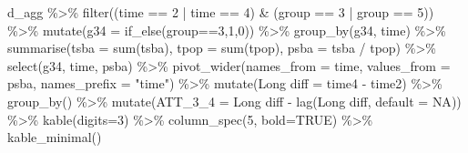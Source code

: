 \documentclass[
]{article}
\newenvironment{Shaded}{\begin{snugshade}}{\end{snugshade}}
\newcommand{\AttributeTok}[1]{\textcolor[rgb]{0.77,0.63,0.00}{#1}}
\newcommand{\ConstantTok}[1]{\textcolor[rgb]{0.00,0.00,0.00}{#1}}
\newcommand{\DecValTok}[1]{\textcolor[rgb]{0.00,0.00,0.81}{#1}}
\newcommand{\FunctionTok}[1]{\textcolor[rgb]{0.00,0.00,0.00}{#1}}
\newcommand{\NormalTok}[1]{#1}
\newcommand{\OtherTok}[1]{\textcolor[rgb]{0.56,0.35,0.01}{#1}}
\newcommand{\SpecialCharTok}[1]{\textcolor[rgb]{0.00,0.00,0.00}{#1}}
\newcommand{\StringTok}[1]{\textcolor[rgb]{0.31,0.60,0.02}{#1}}
\begin{document}
\begin{Shaded}
\begin{Highlighting}[]
\NormalTok{d\_agg }\SpecialCharTok{\%\textgreater{}\%} \FunctionTok{filter}\NormalTok{((time }\SpecialCharTok{==} \DecValTok{2} \SpecialCharTok{|}\NormalTok{ time }\SpecialCharTok{==} \DecValTok{4}\NormalTok{) }\SpecialCharTok{\&}\NormalTok{ (group }\SpecialCharTok{==} \DecValTok{3} \SpecialCharTok{|}\NormalTok{ group }\SpecialCharTok{==} \DecValTok{5}\NormalTok{)) }\SpecialCharTok{\%\textgreater{}\%}
  \FunctionTok{mutate}\NormalTok{(}\AttributeTok{g34 =} \FunctionTok{if\_else}\NormalTok{(group}\SpecialCharTok{==}\DecValTok{3}\NormalTok{,}\DecValTok{1}\NormalTok{,}\DecValTok{0}\NormalTok{)) }\SpecialCharTok{\%\textgreater{}\%}
  \FunctionTok{group\_by}\NormalTok{(g34, time) }\SpecialCharTok{\%\textgreater{}\%}
  \FunctionTok{summarise}\NormalTok{(}\AttributeTok{tsba =} \FunctionTok{sum}\NormalTok{(tsba),}
            \AttributeTok{tpop =} \FunctionTok{sum}\NormalTok{(tpop),}
            \AttributeTok{psba =}\NormalTok{ tsba }\SpecialCharTok{/}\NormalTok{ tpop) }\SpecialCharTok{\%\textgreater{}\%}
  \FunctionTok{select}\NormalTok{(g34, time, psba) }\SpecialCharTok{\%\textgreater{}\%}
  \FunctionTok{pivot\_wider}\NormalTok{(}\AttributeTok{names\_from =}\NormalTok{ time, }\AttributeTok{values\_from =}\NormalTok{ psba,}
              \AttributeTok{names\_prefix =} \StringTok{"time"}\NormalTok{) }\SpecialCharTok{\%\textgreater{}\%}
  \FunctionTok{mutate}\NormalTok{(}\StringTok{\textasciigrave{}}\AttributeTok{Long diff}\StringTok{\textasciigrave{}} \OtherTok{=} \StringTok{\textasciigrave{}}\AttributeTok{time4}\StringTok{\textasciigrave{}} \SpecialCharTok{{-}} \StringTok{\textasciigrave{}}\AttributeTok{time2}\StringTok{\textasciigrave{}}\NormalTok{) }\SpecialCharTok{\%\textgreater{}\%}
  \FunctionTok{group\_by}\NormalTok{() }\SpecialCharTok{\%\textgreater{}\%}
  \FunctionTok{mutate}\NormalTok{(}\AttributeTok{ATT\_3\_4 =} \StringTok{\textasciigrave{}}\AttributeTok{Long diff}\StringTok{\textasciigrave{}} \SpecialCharTok{{-}} \FunctionTok{lag}\NormalTok{(}\StringTok{\textasciigrave{}}\AttributeTok{Long diff}\StringTok{\textasciigrave{}}\NormalTok{, }\AttributeTok{default =} \ConstantTok{NA}\NormalTok{)) }\SpecialCharTok{\%\textgreater{}\%}
  \FunctionTok{kable}\NormalTok{(}\AttributeTok{digits=}\DecValTok{3}\NormalTok{) }\SpecialCharTok{\%\textgreater{}\%}
  \FunctionTok{column\_spec}\NormalTok{(}\DecValTok{5}\NormalTok{, }\AttributeTok{bold=}\ConstantTok{TRUE}\NormalTok{) }\SpecialCharTok{\%\textgreater{}\%}
  \FunctionTok{kable\_minimal}\NormalTok{()}
\end{Highlighting}
\end{Shaded}
\end{document}
